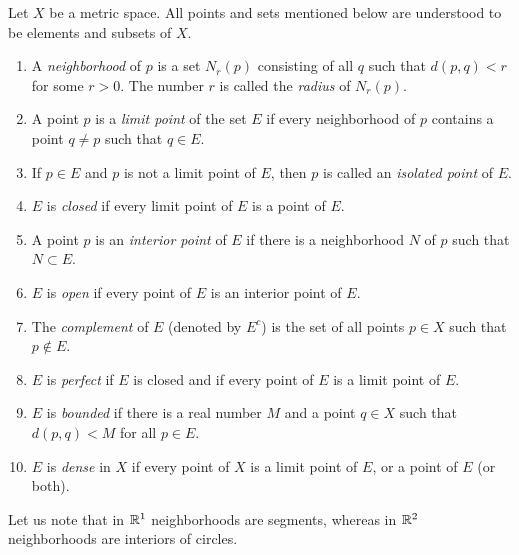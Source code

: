 Let $X$ be a metric space. All points and sets mentioned below are understood
to be elements and subsets of $X$.
\begin{enumerate}[label=(\alph*), leftmargin=2.2em, itemsep=3pt, topsep=4pt]
  \item A \emph{neighborhood} of $p$ is a set $N_r(p)$ consisting of all $q$
        such that $d(p,q) < r$ for some $r > 0$. The number $r$ is called the
        \emph{radius} of $N_r(p)$.
  \item A point $p$ is a \emph{limit point} of the set $E$ if every
        neighborhood of $p$ contains a point $q \ne p$ such that
        $q \in E$.
  \item If $p \in E$ and $p$ is not a limit point of $E$, then $p$ is called an
        \emph{isolated point} of $E$.
  \item $E$ is \emph{closed} if every limit point of $E$ is a point of $E$.
  \item A point $p$ is an \emph{interior point} of $E$ if there is a
        neighborhood $N$ of $p$ such that $N \subset E$.
  \item $E$ is \emph{open} if every point of $E$ is an interior point of $E$.
  \item The \emph{complement} of $E$ (denoted by $E^c$) is the set of all
        points $p \in X$ such that $p \notin E$.
  \item $E$ is \emph{perfect} if $E$ is closed and if every point of $E$ is a
        limit point of $E$.
  \item $E$ is \emph{bounded} if there is a real number $M$ and a point
        $q \in X$ such that $d(p,q) < M$ for all $p \in E$.
  \item $E$ is \emph{dense} in $X$ if every point of $X$ is a limit point of
        $E$, or a point of $E$ (or both).
\end{enumerate}
Let us note that in $\mathbb{R}^1$ neighborhoods are segments, whereas in $\mathbb{R}^2$
neighborhoods are interiors of circles.

